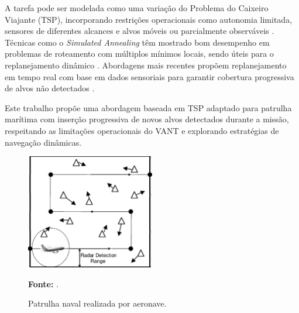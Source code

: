 A tarefa pode ser modelada como uma variação do Problema do Caixeiro Viajante (TSP), incorporando restrições operacionais como autonomia limitada, sensores de diferentes alcances e alvos móveis ou parcialmente observáveis \cite{marlow_2007}. Técnicas como o \textit{Simulated Annealing} têm mostrado bom desempenho em problemas de roteamento com múltiplos mínimos locais, sendo úteis para o replanejamento dinâmico \cite{kosmas_2012}. Abordagens mais recentes propõem replanejamento em tempo real com base em dados sensoriais para garantir cobertura progressiva de alvos não detectados \cite{penicka_2017}.

Este trabalho propõe uma abordagem baseada em TSP adaptado para patrulha marítima com inserção progressiva de novos alvos detectados durante a missão, respeitando as limitações operacionais do VANT e explorando estratégias de navegação dinâmicas.

\begin{figure}[H]
    \centering
    \includegraphics[width=0.5\textwidth]{fig/vant.png}
    \caption{Patrulha naval realizada por aeronave.}
    \small
    \textbf{Fonte:} \cite{marlow_2007}.
\end{figure}
